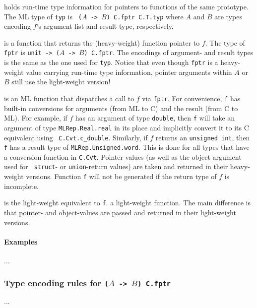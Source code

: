 \documentclass[titlepage,letterpaper]{article}
\begin{document}
\begin{description}\setlength{\itemsep}{0pt}
\item[{\tt val typ}] holds run-time type information for pointers to
  functions of the same prototype.  The ML type of {\tt typ} is {\tt
    ($A$ -> $B$) C.fptr C.T.typ} where $A$ and $B$ are types encoding
  $f$'s argument list and result type, respectively.
\item[{\tt val fptr}] is a function that returns the (heavy-weight)
  function pointer to $f$. The type of {\tt fptr} is {\tt unit -> ($A$
    -> $B$) C.fptr}.  The encodings of argument- and result types is
  the same as the one used for {\tt typ}.  Notice that even though
  {\tt fptr} is a heavy-weight value carrying run-time type
  information, pointer arguments within $A$ or $B$ still use the
  light-weight version!
\item[!{\tt val f}] is an ML function that dispatches a call to $f$
  via {\tt fptr}.  For convenience, {\tt f} has built-in conversions
  for arguments (from ML to C) and the result (from C to ML).  For
  example, if $f$ has an argument of type {\tt double}, then {\tt f}
  will take an argument of type {\tt MLRep.Real.real} in its place and
  implicitly convert it to its C equivalent using {\tt
    C.Cvt.c\_double}.  Similarly, if $f$ returns an {\tt unsigned
    int}, then {\tt f} has a result type of {\tt MLRep.Unsigned.word}.
  This is done for all types that have a conversion function in
  {\tt C.Cvt}.
  Pointer values (as well as the object argument used for {\tt
    struct}- or {\tt union}-return values) are taken and returned in
  their heavy-weight versions.  Function {\tt f} will not be generated
  if the return type of $f$ is incomplete.
\item[{\tt val f'}] is the light-weight equivalent to {\tt f}.  a
  light-weight function.  The main difference is that pointer- and
  object-values are passed and returned in their light-weight
  versions.
\end{description}

\paragraph*{Examples}

...

\subsubsection{Type encoding rules for {\tt ($A$ -> $B$) C.fptr}}

...



%


\end{document}
